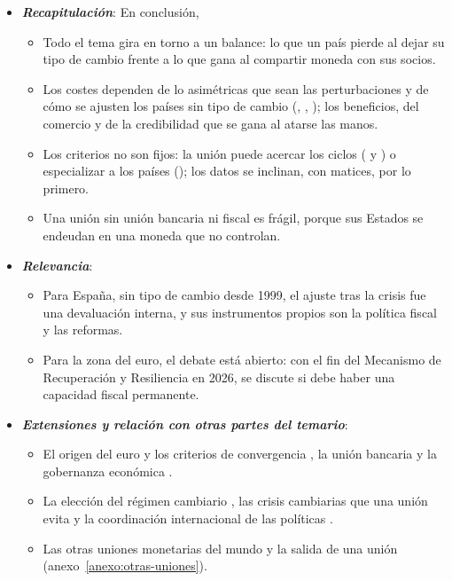 \documentclass[11pt]{article}
\begin{document}
\begin{itemize}
\item \textbf{\emph{Recapitulación}}: En conclusión,
  \begin{itemize}
  \item Todo el tema gira en torno a un balance: lo que un país pierde al dejar su tipo de cambio frente a lo que gana al compartir moneda con sus socios.
  \item Los costes dependen de lo asimétricas que sean las perturbaciones y de cómo se ajusten los países sin tipo de cambio (, , ); los beneficios, del comercio y de la credibilidad que se gana al atarse las manos.
  \item Los criterios no son fijos: la unión puede acercar los ciclos ( y ) o especializar a los países (); los datos se inclinan, con matices, por lo primero.
  \item Una unión sin unión bancaria ni fiscal es frágil, porque sus Estados se endeudan en una moneda que no controlan.
  \end{itemize}
\item \textbf{\emph{Relevancia}}:
  \begin{itemize}
  \item Para España, sin tipo de cambio desde 1999, el ajuste tras la crisis fue una devaluación interna, y sus instrumentos propios son la política fiscal y las reformas.
  \item Para la zona del euro, el debate está abierto: con el fin del Mecanismo de Recuperación y Resiliencia en 2026, se discute si debe haber una capacidad fiscal permanente\nocite{UE2021Reglamento241}.
  \end{itemize}
\item \textbf{\emph{Extensiones y relación con otras partes del temario}}:
  \begin{itemize}
  \item El origen del euro y los criterios de convergencia , la unión bancaria  y la gobernanza económica .
  \item La elección del régimen cambiario , las crisis cambiarias que una unión evita  y la coordinación internacional de las políticas .
  \item Las otras uniones monetarias del mundo y la salida de una unión (anexo~\ref{anexo:otras-uniones}).
  \end{itemize}

\end{itemize}
\end{document}
